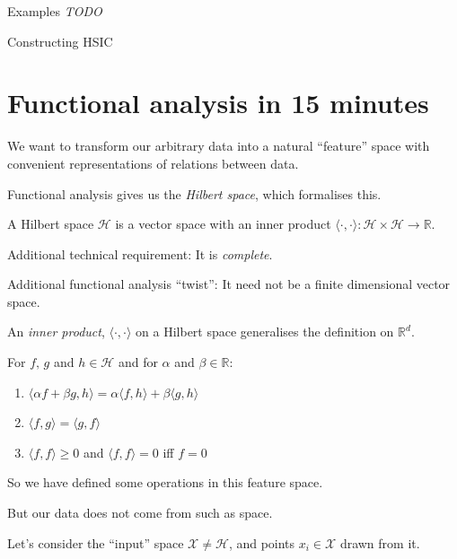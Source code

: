 Examples
\emph{TODO}

Constructing HSIC

\clearpage
\section{Functional analysis in 15 minutes}
We want to transform our arbitrary data into a natural ``feature'' space with convenient representations of relations between data.

Functional analysis gives us the \emph{Hilbert space}, which formalises this.

\clearpage
\begin{defn}
A Hilbert space $\mathcal{H}$ is a vector space with an inner product $\langle\cdot,\cdot\rangle: \mathcal{H}\times\mathcal{H} \rightarrow\mathbb{R}$.
\end{defn}

Additional technical requirement: It is \emph{complete}.

Additional functional analysis ``twist'': It need not be a finite dimensional vector space.
\clearpage
\begin{defn}
An \emph{inner product}, $\langle\cdot,\cdot\rangle$ on a Hilbert space generalises the definition on $\mathbb{R}^d$.

For $f,\,g$ and $h \in \mathcal{H}$ and for $\alpha$ and $\beta \in \mathbb{R}$:
\begin{enumerate}
\item $\langle\alpha f + \beta g, h\rangle = \alpha\langle f, h\rangle + \beta\langle g, h\rangle$
\item $\langle f, g\rangle = \langle g, f \rangle$
\item $\langle f, f \rangle \ge 0$ and $\langle f, f\rangle = 0$ iff $f =0$
\end{enumerate}
\end{defn}

\clearpage

So we have defined some operations in this feature space.

But our data does not come from such as space.

Let's consider the ``input'' space $\mathcal{X}\ne\mathcal{H}$, and points $x_i \in \mathcal{X}$ drawn from it.

